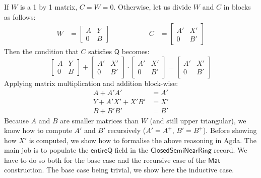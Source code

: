 \documentclass{CSML}
\numberwithin{theorem}{section}
\newcommand{\Conid}[1]{\mathit{#1}}
\newcommand{\Varid}[1]{\mathit{#1}}
\renewcommand\Varid[1]{\ensuremath{\mathsf{#1}}}
\renewcommand\Conid[1]{\ensuremath{\mathsf{#1}}}
\newcommand{\closure}[1]{{#1}^+}
\newcommand{\tritwo}[4][]{
\twobytwo{#2}{#3}{0}{#4}
}
\newcommand{\twobytwo}[4]{
  \begin{bmatrix}
    #1&#2\\#3&#4
  \end{bmatrix}
}
\begin{document}
If $W$ is a 1 by 1 matrix, $C = W = 0$.
Otherwise, let us divide $W$ and $C$ in blocks as follows:
\begin{align*}
   W &= \tritwo A Y B \hspace{2cm} &  C &= \tritwo {A'} {X'} {B'}
\end{align*}
Then the condition that $C$ satisfies \ensuremath{\Conid{Q}} becomes:
$$ \tritwo A Y B + \tritwo {A'} {X'} {B'} ·
                   \tritwo {A'} {X'} {B'} = \tritwo {A'} {X'} {B'} $$
Applying matrix multiplication and addition block-wise:
\begin{align*}
 A + A' A'         &=  A'\\
 Y + A' X'+X' B'   &=  X'\\
 B + B' B'         &=  B'
\end{align*}
Because $A$ and $B$ are smaller matrices than $W$ (and still upper triangular),
we know how to compute $A'$ and $B'$ recursively ($A' = \closure A$,
$B' = \closure B$). Before showing how $X'$ is computed, we show how to formalise
the above reasoning in Agda. The main job is to populate the \ensuremath{\Varid{entireQ}} field
in the \ensuremath{\Conid{ClosedSemiNearRing}} record. We have to do so both for the base case and the
recursive case of the \ensuremath{\Conid{Mat}} construction. The base case being trivial, we show
here the inductive case.
\end{document}
